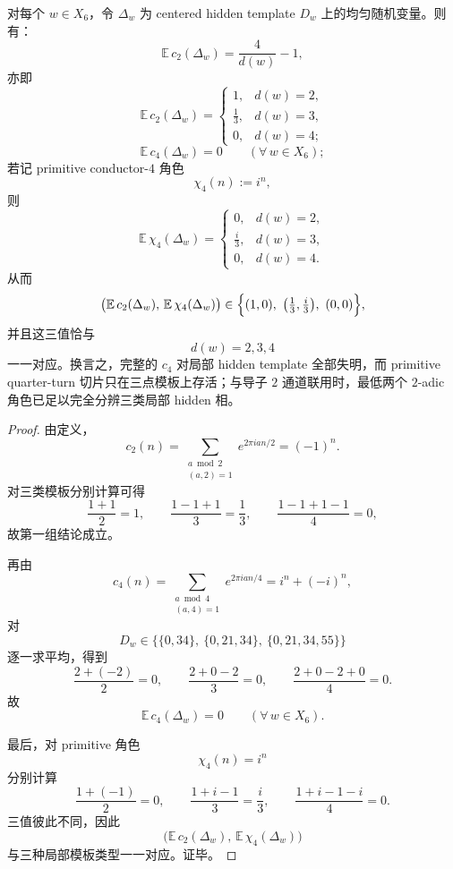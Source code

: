 \begin{theorem}\label{thm:conclusion-window6-conductor-two-quarterturn-selection}
对每个 \(w\in X_6\)，令 \(\Delta_w\) 为 centered hidden template \(D_w\) 上的均匀随机变量。则有：
\[
\mathbb E\,c_2(\Delta_w)=\frac{4}{d(w)}-1,
\]
亦即
\[
\mathbb E\,c_2(\Delta_w)=
\begin{cases}
1,& d(w)=2,\\[2mm]
\frac13,& d(w)=3,\\[2mm]
0,& d(w)=4;
\end{cases}
\]
\[
\mathbb E\,c_4(\Delta_w)=0
\qquad (\forall\, w\in X_6);
\]
若记 primitive conductor-\(4\) 角色
\[
\chi_4(n):=i^n,
\]
则
\[
\mathbb E\,\chi_4(\Delta_w)=
\begin{cases}
0,& d(w)=2,\\[2mm]
\frac{i}{3},& d(w)=3,\\[2mm]
0,& d(w)=4.
\end{cases}
\]
从而
\[
\bigl(\mathbb E\,c_2(\Delta_w),\,\mathbb E\,\chi_4(\Delta_w)\bigr)
\in
\Bigl\{(1,0),\ \bigl(\tfrac13,\tfrac{i}{3}\bigr),\ (0,0)\Bigr\},
\]
并且这三值恰与
\[
d(w)=2,3,4
\]
一一对应。换言之，完整的 \(c_4\) 对局部 hidden template 全部失明，而 primitive quarter-turn 切片只在三点模板上存活；与导子 \(2\) 通道联用时，最低两个 \(2\)-adic 角色已足以完全分辨三类局部 hidden 相。
\end{theorem}
\begin{proof}
由定义，
\[
c_2(n)=\sum_{\substack{a\bmod 2\\(a,2)=1}}e^{2\pi i an/2}=(-1)^n.
\]
对三类模板分别计算可得
\[
\frac{1+1}{2}=1,\qquad
\frac{1-1+1}{3}=\frac13,\qquad
\frac{1-1+1-1}{4}=0,
\]
故第一组结论成立。

再由
\[
c_4(n)=\sum_{\substack{a\bmod 4\\(a,4)=1}}e^{2\pi i an/4}=i^n+(-i)^n,
\]
对
\[
D_w\in\bigl\{\{0,34\},\ \{0,21,34\},\ \{0,21,34,55\}\bigr\}
\]
逐一求平均，得到
\[
\frac{2+(-2)}{2}=0,\qquad
\frac{2+0-2}{3}=0,\qquad
\frac{2+0-2+0}{4}=0.
\]
故
\[
\mathbb E\,c_4(\Delta_w)=0
\qquad (\forall\, w\in X_6).
\]

最后，对 primitive 角色
\[
\chi_4(n)=i^n
\]
分别计算
\[
\frac{1+(-1)}{2}=0,\qquad
\frac{1+i-1}{3}=\frac{i}{3},\qquad
\frac{1+i-1-i}{4}=0.
\]
三值彼此不同，因此
\[
\bigl(\mathbb E\,c_2(\Delta_w),\,\mathbb E\,\chi_4(\Delta_w)\bigr)
\]
与三种局部模板类型一一对应。证毕。
\end{proof}

